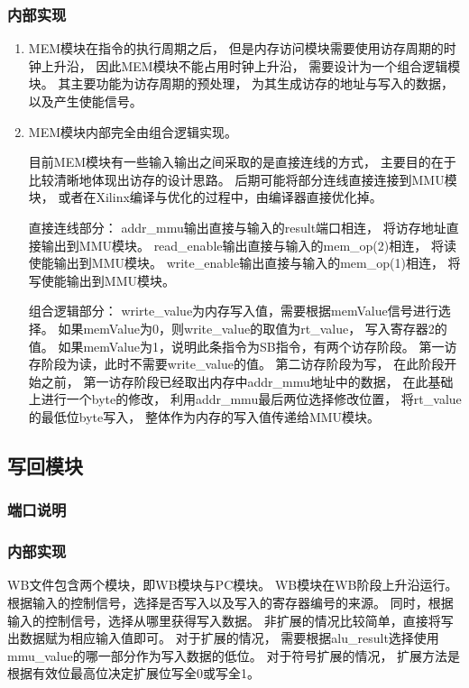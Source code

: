         \subsubsection{内部实现}
            \begin{enumerate}
            \item
            MEM模块在指令的执行周期之后，%
            但是内存访问模块需要使用访存周期的时钟上升沿，%
            因此MEM模块不能占用时钟上升沿，%
            需要设计为一个组合逻辑模块。%
            其主要功能为访存周期的预处理，%
            为其生成访存的地址与写入的数据，以及产生使能信号。
            \item
            MEM模块内部完全由组合逻辑实现。%

            目前MEM模块有一些输入输出之间采取的是直接连线的方式，%
            主要目的在于比较清晰地体现出访存的设计思路。%
            后期可能将部分连线直接连接到MMU模块，%
            或者在Xilinx编译与优化的过程中，由编译器直接优化掉。

            直接连线部分：%
            addr\_mmu输出直接与输入的result端口相连，%
            将访存地址直接输出到MMU模块。%
            read\_enable输出直接与输入的mem\_op(2)相连，%
            将读使能输出到MMU模块。%
            write\_enable输出直接与输入的mem\_op(1)相连，
            将写使能输出到MMU模块。
        
            组合逻辑部分：%
            wrirte\_value为内存写入值，需要根据memValue信号进行选择。%
            如果memValue为0，则write\_value的取值为rt\_value，%
            写入寄存器2的值。%
            如果memValue为1，说明此条指令为SB指令，有两个访存阶段。%
            第一访存阶段为读，此时不需要write\_value的值。%
            第二访存阶段为写，%
            在此阶段开始之前，%
            第一访存阶段已经取出内存中addr\_mmu地址中的数据，%
            在此基础上进行一个byte的修改，%
            利用addr\_mmu最后两位选择修改位置，%
            将rt\_value的最低位byte写入，%
            整体作为内存的写入值传递给MMU模块。%
        \end{enumerate}
    \subsection{写回模块}
        \subsubsection{端口说明}
            
        \subsubsection{内部实现}
            WB文件包含两个模块，即WB模块与PC模块。%
            WB模块在WB阶段上升沿运行。%
            根据输入的控制信号，选择是否写入以及写入的寄存器编号的来源。%
            同时，根据输入的控制信号，选择从哪里获得写入数据。%
            非扩展的情况比较简单，直接将写出数据赋为相应输入值即可。%
            对于扩展的情况，%
            需要根据alu\_result选择使用mmu\_value的哪一部分作为写入数据的低位。
            对于符号扩展的情况，%
            扩展方法是根据有效位最高位决定扩展位写全0或写全1。
            
